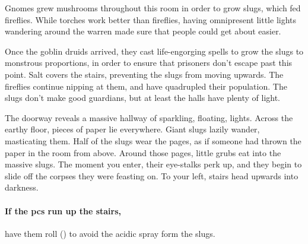 \begin{multicols}{2}


\begin{exampletext}

Gnomes grew mushrooms throughout this room in order to grow slugs, which fed fireflies.
While torches work better than fireflies, having omnipresent little lights wandering around the warren made sure that people could get about easier.

Once the goblin druids arrived, they cast life-engorging spells to grow the slugs to monstrous proportions, in order to ensure that prisoners don't escape past this point.
Salt covers the stairs, preventing the slugs from moving upwards.
The fireflies continue nipping at them, and have quadrupled their population.
The slugs don't make good guardians, but at least the halls have plenty of light.

\end{exampletext}

\begin{boxtext}

  The doorway reveals a massive hallway of sparkling, floating, lights.
  Across the earthy floor, pieces of paper lie everywhere.
  Giant slugs lazily wander, masticating them.
  Half of the slugs wear the pages, as if someone had thrown the paper in the room from above.
  Around those pages, little grubs eat into the massive slugs.
  The moment you enter, their eye-stalks perk up, and they begin to slide off the corpses they were feasting on.
  To your left, stairs head upwards into darkness.

\end{boxtext}

\paragraph{If the \glspl{pc} run up the stairs,}
have them roll  (\tn[7]) to avoid the acidic spray form the slugs.


\end{multicols}
